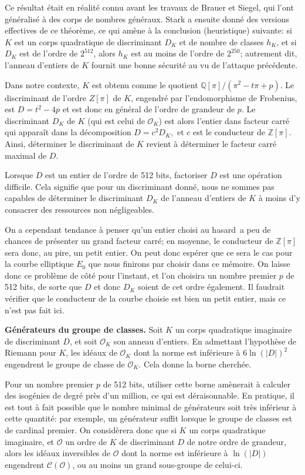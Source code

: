 \documentclass[11pt,a4paper]{article}
\newcommand{\Z}{\mathbb{Z}}
\newcommand{\Q}{\mathbb{Q}}
\renewcommand{\O}{\mathcal{O}}
\newcommand{\Cl}{\mathcal{C}}
\renewcommand{\v}{\vspace{5mm}}
\theoremstyle{definition}
\begin{document}
Ce résultat était en réalité connu avant les travaux de Brauer et Siegel, qui l'ont généralisé à des corps de nombres généraux. Stark a ensuite donné des versions effectives de ce théorème, ce qui amène à la conclusion (heuristique) suivante: si $K$ est un corps quadratique de discriminant $D_K$ et de nombre de classes $h_K$, et si $D_K$ est de l'ordre de $2^{512}$, alors $h_K$ est au moins de l'ordre de $2^{250}$; autrement dit, l'anneau d'entiers de $K$ fournit une bonne sécurité au vu de l'attaque précédente.

\v
Dans notre contexte, $K$ est obtenu comme le quotient $\Q[\pi]/(\pi^2  - t\pi + p)$. Le discriminant de l'ordre $Z[\pi]$ de $K$, engendré par l'endomorphisme de Frobenius, est $D = t^2 - 4 p$ et est donc en général de l'ordre de grandeur de $p$. Le discriminant $D_K$ de $K$ (qui est celui de $\O_K$) est alors l'entier dans facteur carré qui apparaît dans la décomposition $D = c^2 D_K,$ et $c$ est le conducteur de $\Z[\pi]$. Ainsi, déterminer le discriminant de $K$ revient à déterminer le facteur carré maximal de $D$.

Lorsque $D$ est un entier de l'ordre de 512 bits, factoriser $D$ est une opération difficile. Cela signifie que pour un discriminant donné, nous ne sommes pas capables de déterminer le discriminant $D_K$ de l'anneau d'entiers de $K$ à moins d'y consacrer des ressources non négligeables.

On a cependant tendance à penser qu'un entier choisi \og au hasard\fg\ a peu de chances de présenter un grand facteur carré; en moyenne, le conducteur de $\Z[\pi]$ sera donc, au pire, un petit entier. On peut donc espérer que ce sera le cas pour la courbe elliptique $E_0$ que nous finirons par choisir dans ce mémoire. On laisse donc ce problème de côté pour l'instant, et l'on choisira un nombre premier $p$ de 512 bits, de sorte que $D$ et donc $D_K$ soient de cet ordre également. Il faudrait vérifier que le conducteur de la courbe choisie est bien un petit entier, mais ce n'est pas fait ici.

\v
\textbf{Générateurs du groupe de classes.}
Soit $K$ un corps quadratique imaginaire de discriminant $D$, et soit $\O_K$ son anneau d'entiers. En admettant l'hypothèse de Riemann pour $K$, les idéaux de $\O_K$ dont la norme est inférieure à $6\ln(|D|)^2$ engendrent le groupe de classe de $\O_K$. Cela donne la borne cherchée.

Pour un nombre premier $p$ de 512 bits, utiliser cette borne amènerait à calculer des isogénies de degré près d'un million, ce qui est déraisonnable. En pratique, il est tout à fait possible que le nombre minimal de générateurs soit très inférieur à cette quantité: par exemple, un générateur suffit lorsque le groupe de classes est de cardinal premier. On considèrera donc que si $K$ un corps quadratique imaginaire, et $\O$ un ordre de $K$ de discriminant $D$ de notre ordre de grandeur, alors les idéaux inversibles de $\O$ dont la norme est inférieure à $\ln(|D|)$ engendrent $\Cl(\O)$, ou au moins un grand sous-groupe de celui-ci.
\end{document}
